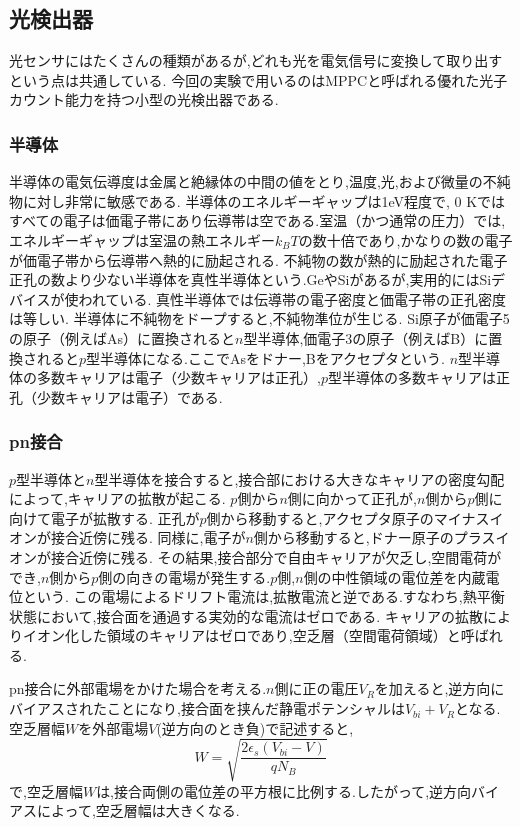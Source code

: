 \subsection{光検出器}
光センサにはたくさんの種類があるが,どれも光を電気信号に変換して取り出すという点は共通している.
今回の実験で用いるのはMPPCと呼ばれる優れた光子カウント能力を持つ小型の光検出器である.

\subsubsection{半導体}
半導体の電気伝導度は金属と絶縁体の中間の値をとり,温度,光,および微量の不純物に対し非常に敏感である.
半導体のエネルギーギャップは1eV程度で, 0 Kではすべての電子は価電子帯にあり伝導帯は空である.室温（かつ通常の圧力）では,エネルギーギャップは室温の熱エネルギー$k_BT$の数十倍であり,かなりの数の電子が価電子帯から伝導帯へ熱的に励起される.
不純物の数が熱的に励起された電子正孔の数より少ない半導体を真性半導体という.GeやSiがあるが,実用的にはSiデバイスが使われている.
真性半導体では伝導帯の電子密度と価電子帯の正孔密度は等しい.
半導体に不純物をドープすると,不純物準位が生じる.
Si原子が価電子5の原子（例えばAs）に置換されると$n$型半導体,価電子3の原子（例えばB）に置換されると$p$型半導体になる.ここでAsをドナー,Bをアクセプタという.
$n$型半導体の多数キャリアは電子（少数キャリアは正孔）,$p$型半導体の多数キャリアは正孔（少数キャリアは電子）である.

\subsubsection{pn接合}
$p$型半導体と$n$型半導体を接合すると,接合部における大きなキャリアの密度勾配によって,キャリアの拡散が起こる.
$p$側から$n$側に向かって正孔が,$n$側から$p$側に向けて電子が拡散する.
正孔が$p$側から移動すると,アクセプタ原子のマイナスイオンが接合近傍に残る.
同様に,電子が$n$側から移動すると,ドナー原子のプラスイオンが接合近傍に残る.
その結果,接合部分で自由キャリアが欠乏し,空間電荷ができ,$n$側から$p$側の向きの電場が発生する.$p$側,$n$側の中性領域の電位差を内蔵電位という.
この電場によるドリフト電流は,拡散電流と逆である.すなわち,熱平衡状態において,接合面を通過する実効的な電流はゼロである.
キャリアの拡散によりイオン化した領域のキャリアはゼロであり,空乏層（空間電荷領域）と呼ばれる.

pn接合に外部電場をかけた場合を考える.$n$側に正の電圧$V_R$を加えると,逆方向にバイアスされたことになり,接合面を挟んだ静電ポテンシャルは$V_{bi}+V_R$となる.
空乏層幅$W$を外部電場$V$(逆方向のとき負)で記述すると,
\begin{equation}
W=\sqrt{\frac{2\epsilon_s(V_{bi}-V)}{qN_B}}
\end{equation}
で,空乏層幅$W$は,接合両側の電位差の平方根に比例する.したがって,逆方向バイアスによって,空乏層幅は大きくなる.

